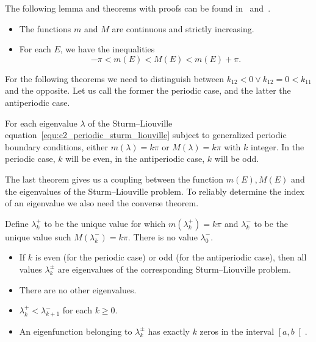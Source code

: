 The following lemma and theorems with proofs can be found in~\cite{binding_prufer_2012} and~\cite{binding_prufer_2013a}.
\begin{lemma}\label{lem:c2_periodic_m_inequality}\hfill
    \begin{itemize}
        \item The functions $m$ and $M$ are continuous and strictly increasing.
        \item For each $E$, we have the inequalities
              $$
                  -\pi < m(E) < M(E) < m(E) + \pi\text{.}
              $$
    \end{itemize}
\end{lemma}

For the following theorems we need to distinguish between $k_{12} < 0 \lor k_{12} = 0 < k_{11}$ and the opposite. Let us call the former the periodic case, and the latter the antiperiodic case.

\begin{theorem}
    For each eigenvalue $\lambda$ of the Sturm--Liouville equation~\eqref{equ:c2_periodic_sturm_liouville} subject to generalized periodic boundary conditions, either $m(\lambda) = k\pi$ or $M(\lambda) = k\pi$ with $k$ integer. In the periodic case, $k$ will be even, in the antiperiodic case, $k$ will be odd.
\end{theorem}

The last theorem gives us a coupling between the function $m(E), M(E)$ and the eigenvalues of the Sturm--Liouville problem. To reliably determine the index of an eigenvalue we also need the converse theorem.

\begin{theorem}\label{the:c2_prufer_periodic_index}
    Define $\lambda_k^{+}$ to be the unique value for which $m(\lambda_k^{+}) = k\pi$ and $\lambda_k^{-}$ to be the unique value such $M(\lambda_k^{-}) = k\pi$. There is no value $\lambda_0^{-}$.
    \begin{itemize}
        \item If $k$ is even (for the periodic case) or odd (for the antiperiodic case), then all values $\lambda^{\pm}_k$ are eigenvalues of the corresponding Sturm--Liouville problem.
        \item There are no other eigenvalues.
        \item $\lambda_k^{+} < \lambda_{k+1}^{-}$ for each $k \geq 0$.
        \item An eigenfunction belonging to $\lambda_k^{\pm}$ has exactly $k$ zeros in the interval $\left[a, b\right[$.
    \end{itemize}
\end{theorem}

